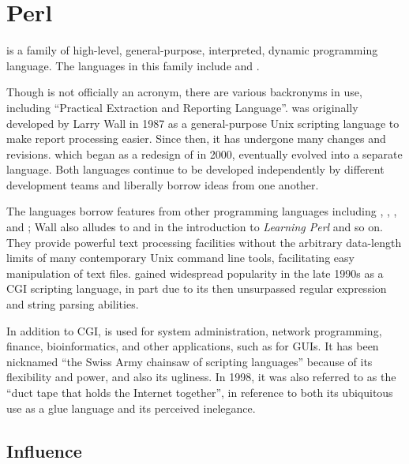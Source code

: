 \documentclass[../Languages.tex]{subfiles}
\begin{document}
\section{Perl}\label{sec:perl}

 is a family of high-level, general-purpose, interpreted, dynamic
programming language. The languages in this family include  and
.

Though  is not officially an acronym, there are various backronyms in
use, including ``Practical Extraction and Reporting Language''.  was
originally developed by Larry Wall in 1987 as a general-purpose Unix scripting
language to make report processing easier. Since then, it has undergone many
changes and revisions.  which began as a redesign of  in
2000, eventually evolved into a separate language. Both languages continue to
be developed independently by different development teams and liberally borrow
ideas from one another.

The  languages borrow features from other programming languages
including , , , and ; Wall also alludes to
 and  in the introduction to \textit{Learning Perl} and so
on. They provide powerful text processing facilities without the arbitrary
data-length limits of many contemporary Unix command line tools, facilitating
easy manipulation of text files.  gained widespread popularity in
the late 1990s as a CGI scripting language, in part due to its then unsurpassed
regular expression and string parsing abilities.

In addition to CGI,  is used for system administration, network
programming, finance, bioinformatics, and other applications, such as for
GUIs. It has been nicknamed ``the Swiss Army chainsaw of scripting languages''
because of its flexibility and power, and also its ugliness. In 1998, it was
also referred to as the ``duct tape that holds the Internet together'', in
reference to both its ubiquitous use as a glue language and its perceived
inelegance.

\subsection{Influence}\label{sub:influence}
\end{document}

